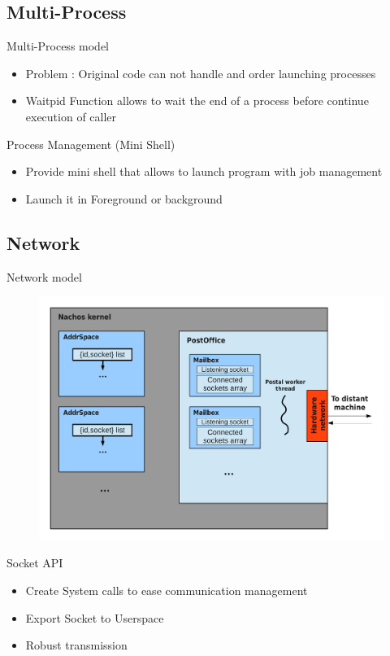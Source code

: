 \documentclass{beamer}
\begin{document}
\subsection{Multi-Process}
\begin{frame}{Multi-Process model}
  \begin{itemize}
      \item Problem : Original code can not handle and
      order launching processes
      \item Waitpid Function allows to wait the end of a 
      process before continue execution of caller
  \end{itemize}
\end{frame}

\begin{frame}{Process Management (Mini Shell)}
  \begin{itemize}
      \item Provide mini shell that allows to launch 
      program with job management
      \item Launch it in Foreground or background
  \end{itemize}
\end{frame}

\subsection{Network}
\begin{frame}{Network model}
    \begin{figure}[ht]
        \includegraphics[width=0.7\linewidth]{Networkcolored.pdf}
    \end{figure}
\end{frame}

\begin{frame}{Socket API}
    \begin{itemize}
        \item Create System calls to ease communication management
        \item Export Socket to Userspace 
        \item Robust transmission
    \end{itemize}
\end{frame}
\end{document}

